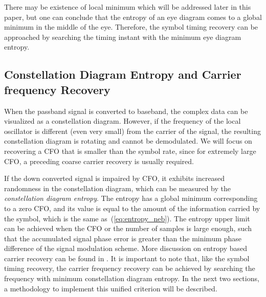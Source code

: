 \documentclass[journal,comsoc,onecolumn, 12pt,draftclsnofoot]{IEEEtran}
\begin{document}
There may be existence of local minimum which will be addressed later in this paper,
but one can conclude that the entropy of an eye diagram comes to a global minimum in the middle of the eye.
Therefore, the symbol timing recovery can be approached by searching the timing instant with the minimum eye diagram entropy.


\subsection{Constellation Diagram Entropy and Carrier frequency Recovery}
\label{sec:const_entp}
When the passband signal is converted to baseband, the complex data can be visualized as a constellation diagram.
However, if the frequency of the local oscillator is  different (even very small) from the carrier of the signal, the resulting constellation diagram is rotating and cannot be demodulated.
We will focus on recovering a CFO that is smaller than the symbol rate, since for extremely large CFO, a preceding coarse carrier recovery is usually required.

If the down converted signal is impaired by CFO, it exhibits increased randomness in the constellation diagram, which can be measured by the \textit{constellation diagram entropy}.
The entropy has a global minimum corresponding to a zero CFO, and its value is equal to the amount of the information carried by the symbol, which is the same as~(\ref{eq:entropy_neb}).
The entropy upper limit can be achieved when the CFO or the number of samples is large enough,
such that the accumulated signal phase error is greater than the minimum phase difference of the signal modulation scheme. 
More discussion on entropy based carrier recovery can be found in \cite{Pedzisz2006}.
It is important to note that, like the symbol timing recovery, the carrier frequency recovery can be achieved by searching the frequency with minimum constellation diagram entropy.
In the next two sections, a methodology to implement this unified criterion will be described.
\end{document}
